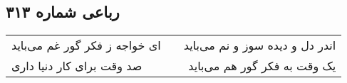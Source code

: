 \begin{center}
\section*{رباعی شماره ۳۱۳}
\label{sec:sh313}
\begin{longtable}{l p{0.5cm} r}
ای خواجه ز فکر گور غم می‌باید
&&
اندر دل و دیده سوز و نم می‌باید
\\
صد وقت برای کار دنیا داری
&&
یک وقت به فکر گور هم می‌باید
\\
\end{longtable}
\end{center}
